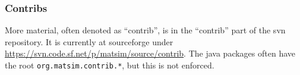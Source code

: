 
\subsubsection{Contribs}
More material, often denoted as ``contrib'', is in the ``contrib'' part of the \gls{svn} repository.  
It is currently at \gls{sourceforge} under \url{https://svn.code.sf.net/p/matsim/source/contrib}.  
The \gls{java} packages often have the root \lstinline{org.matsim.contrib.*}, but this is not enforced.

